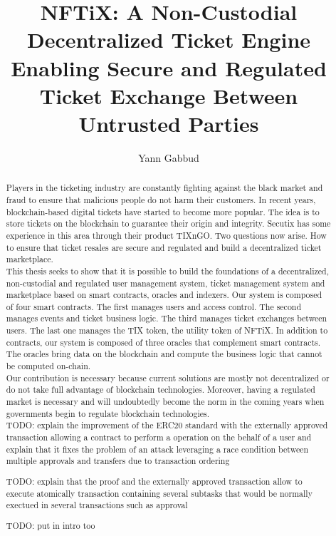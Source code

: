 \documentclass[a4paper,11pt,oneside]{report}
\title{NFTiX: A Non-Custodial Decentralized Ticket Engine Enabling Secure and Regulated Ticket Exchange Between Untrusted Parties}
\author{Yann Gabbud}
\affiliation{Distributed Computing Laboratory \\
and \\
Secutix SA, an ELCA company \\}
\begin{document}
\maketitle
\makeacks

\begin{abstract}
Players in the ticketing industry are constantly fighting against the black market and fraud to ensure that malicious people do not harm their customers. In recent years, blockchain-based digital tickets have started to become more popular. The idea is to store tickets on the blockchain to guarantee their origin and integrity. Secutix has some experience in this area through their product TIXnGO. Two questions now arise. How to ensure that ticket resales are secure and regulated and build a decentralized ticket marketplace. \\

This thesis seeks to show that it is possible to build the foundations of a decentralized, non-custodial and regulated user management system, ticket management system and marketplace based on smart contracts, oracles and indexers. Our system is composed of four smart contracts. The first manages users and access control. The second manages events and ticket business logic. The third manages ticket exchanges between users. The last one manages the TIX token, the utility token of NFTiX. In addition to contracts, our system is composed of three oracles that complement smart contracts. The oracles bring data on the blockchain and compute the business logic that cannot be computed on-chain. \\

Our contribution is necessary because current solutions are mostly not decentralized or do not take full advantage of blockchain technologies. Moreover, having a regulated market is necessary and will undoubtedly become the norm in the coming years when governments begin to regulate blockchain technologies. \\

TODO: explain the improvement of the ERC20 standard with the externally approved transaction allowing a contract to perform a operation on the behalf of a user and explain that it fixes the problem of an attack leveraging a race condition between multiple approvals and transfers due to transaction ordering 

TODO: explain that the proof and the externally approved transaction allow to execute atomically transaction containing several subtasks that would be normally exectued in several transactions such as approval

TODO: put in intro too

\end{abstract}
\end{document}
